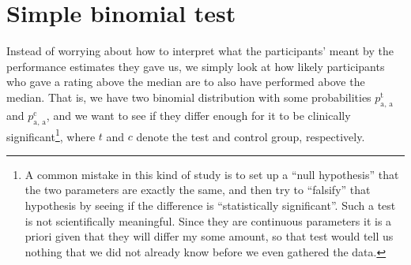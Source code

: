 \documentclass[10pt, twoside,a4paper]{article}
\begin{document}
\newpage
\section{Simple binomial test}\label{sec_binomial}
Instead of worrying about how to interpret what the participants' meant by the performance estimates they gave us, we simply look at how likely participants who gave a rating above the median are to also have performed above the median. That is, we have two binomial distribution with some probabilities $p^{\text{t}}_{\text{a, a}}$ and $p^{\text{c}}_{\text{a, a}}$, and we want to see if they differ enough for it to be clinically significant\footnote{A common mistake in this kind of study is to set up a ``null hypothesis'' that the two parameters are exactly the same, and then try to ``falsify'' that hypothesis by seeing if the difference is ``statistically significant''. Such a test is not scientifically meaningful. Since they are continuous parameters it is a priori given that they will differ my some amount, so that test would tell us nothing that we did not already know before we even gathered the data.}, where $t$ and $c$ denote the test and control group, respectively.
\end{document}

